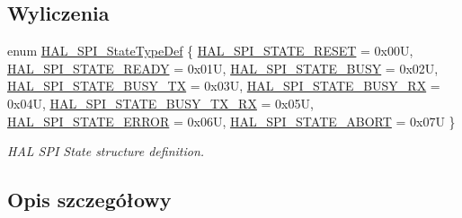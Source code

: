 \subsection*{Wyliczenia}
\begin{DoxyCompactItemize}
\item 
enum \hyperlink{group___s_p_i___exported___types_ga8891cb64e76198a860172d94c638c9b4}{H\+A\+L\+\_\+\+S\+P\+I\+\_\+\+State\+Type\+Def} \{ \newline
\hyperlink{group___s_p_i___exported___types_gga8891cb64e76198a860172d94c638c9b4adbc218df2c9841b561282b40b3ded69d}{H\+A\+L\+\_\+\+S\+P\+I\+\_\+\+S\+T\+A\+T\+E\+\_\+\+R\+E\+S\+ET} = 0x00U, 
\hyperlink{group___s_p_i___exported___types_gga8891cb64e76198a860172d94c638c9b4abb3992c67a15c14bd1808ef6b63fa926}{H\+A\+L\+\_\+\+S\+P\+I\+\_\+\+S\+T\+A\+T\+E\+\_\+\+R\+E\+A\+DY} = 0x01U, 
\hyperlink{group___s_p_i___exported___types_gga8891cb64e76198a860172d94c638c9b4a0635e168bc0430253fe8e74cfe9768fd}{H\+A\+L\+\_\+\+S\+P\+I\+\_\+\+S\+T\+A\+T\+E\+\_\+\+B\+U\+SY} = 0x02U, 
\hyperlink{group___s_p_i___exported___types_gga8891cb64e76198a860172d94c638c9b4a5d82b644c7ca656ab5fe8a8e3cbc29ab}{H\+A\+L\+\_\+\+S\+P\+I\+\_\+\+S\+T\+A\+T\+E\+\_\+\+B\+U\+S\+Y\+\_\+\+TX} = 0x03U, 
\newline
\hyperlink{group___s_p_i___exported___types_gga8891cb64e76198a860172d94c638c9b4afd7e00128aca1feaa099c2595ffb9277}{H\+A\+L\+\_\+\+S\+P\+I\+\_\+\+S\+T\+A\+T\+E\+\_\+\+B\+U\+S\+Y\+\_\+\+RX} = 0x04U, 
\hyperlink{group___s_p_i___exported___types_gga8891cb64e76198a860172d94c638c9b4a9dae2883ae3e43ca28afc9453a14c938}{H\+A\+L\+\_\+\+S\+P\+I\+\_\+\+S\+T\+A\+T\+E\+\_\+\+B\+U\+S\+Y\+\_\+\+T\+X\+\_\+\+RX} = 0x05U, 
\hyperlink{group___s_p_i___exported___types_gga8891cb64e76198a860172d94c638c9b4a3cba266d2346abe3b62fa0acccab4711}{H\+A\+L\+\_\+\+S\+P\+I\+\_\+\+S\+T\+A\+T\+E\+\_\+\+E\+R\+R\+OR} = 0x06U, 
\hyperlink{group___s_p_i___exported___types_gga8891cb64e76198a860172d94c638c9b4a34f9231d040d752a034db85e3eb7f782}{H\+A\+L\+\_\+\+S\+P\+I\+\_\+\+S\+T\+A\+T\+E\+\_\+\+A\+B\+O\+RT} = 0x07U
 \}\begin{DoxyCompactList}\small\item\em H\+AL S\+PI State structure definition. \end{DoxyCompactList}
\end{DoxyCompactItemize}


\subsection{Opis szczegółowy}


